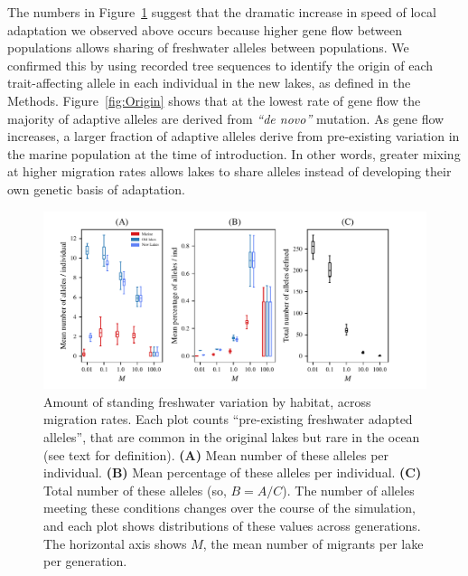 \documentclass{article}
\begin{document}
The numbers in Figure~\ref{fig:MPFAI} suggest that
the dramatic increase in speed of local adaptation we observed above occurs because
higher gene flow between populations allows sharing of freshwater alleles between populations.
We confirmed this by using recorded tree sequences to identify the origin of each trait-affecting allele
in each individual in the new lakes, as defined in the Methods.
Figure~\ref{fig:Origin} shows that at the lowest rate of gene flow the majority of adaptive alleles are derived from \emph{``de novo''} mutation.
As gene flow increases, a larger fraction of adaptive alleles 
derive from pre-existing variation in the marine population at the time of introduction.
In other words, 
greater mixing at higher migration rates allows lakes to share alleles
instead of developing their own genetic basis of adaptation.

\begin{figure}
    \begin{center}
          \includegraphics{Final_Plots/Freshwater_Alleles.pdf}
          \caption{
            Amount of standing freshwater variation by habitat, across migration rates.
            Each plot counts ``pre-existing freshwater adapted alleles'',
            that are common in the original lakes but rare in the ocean
            (see text for definition).
            \textbf{(A)} Mean number of these alleles per individual.
            \textbf{(B)} Mean percentage of these alleles per individual.
            \textbf{(C)} Total number of these alleles (so, $B = A/C$).
            The number of alleles meeting these conditions changes over the course of the simulation,
            and each plot shows distributions of these values across generations.
            The horizontal axis shows $M$, the mean number of migrants per lake per generation.
        }
        \label{fig:MPFAI}
    \end{center}
\end{figure}
\end{document}
